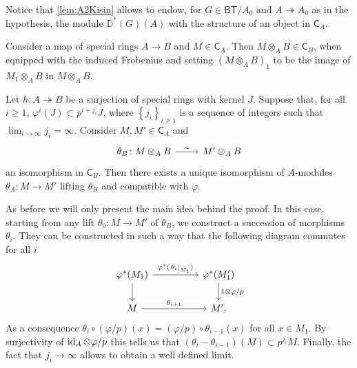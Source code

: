 \begin{rem}[]
	Notice that \cref{lem:A2Kisin} allows to endow,
	for $G \in \mathsf{BT}/A_0$ and $A \twoheadrightarrow A_0$ as in the hypothesis,
	the module $\mathbb{D}^*(G)(A)$ with the structure of an object in $\mathsf{C}_A$.
\end{rem}


\begin{defn}[]
	Consider a map of special rings $A \to B$ and $M \in \mathsf{C}_A$.
	Then $M \otimes_A B \in \mathsf{C}_B$, when equipped with
	the induced Frobenius %
	and setting
	$\left( M \otimes_A B \right)_1$ to be the image of
	$M_1 \otimes_A B$ in $M \otimes_A B$.
\end{defn}


\begin{lem}\label{lem:A4Kisin}
	Let $h\colon A \twoheadrightarrow B$ be a surjection of special rings with kernel $J$.
	Suppose that, for all $i \geq 1$, $\varphi^i(J) \subset p^{i + j_i} J$,
	where $\left\{ j_i \right\}_{i \geq 1}$ is a sequence of integers
	such that $\lim_{i \to \infty} j_i = \infty$.
	Consider $M, M' \in \mathsf{C}_A$ and
	\begin{equation*}
	\begin{tikzcd}[row sep = 0ex
		,/tikz/column 1/.append style={anchor=base east}
		,/tikz/column 2/.append style={anchor=base west}]
		\theta_B\colon M \otimes_A B 
		\arrow[r, "\sim", rightarrow] &
		M' \otimes_A B
	\end{tikzcd}
	\end{equation*} 
	an isomorphism in $\mathsf{C}_B$.
	Then there exists a unique isomorphism of $A$-modules
	$\theta_A\colon M \to M'$ lifting $\theta_B$ and compatible with $\varphi$.
\end{lem} 


\begin{rem}[]
	As before we will only present the main idea behind the proof.
	In this case, starting from any lift $\theta_0\colon M \to M'$
	of $\theta_B$, we construct a succession of morphisms \(\theta_i\).
	They can be constructed in such a way that the following diagram commutes for all \(i\)
	\begin{equation*}
	\begin{tikzcd}[column sep=4.8em]
		\varphi^*(M_1) \arrow[r, "\varphi^*(\left.\theta_i\right|_{ M_1 })", rightarrow] 
		\arrow[d, "", rightarrow] &
		\varphi^*(M_1') \arrow[d, "1 \otimes \varphi/p", rightarrow] \\
		M \arrow[r, "\theta_{ i+1 }", rightarrow] &
		M'.
	\end{tikzcd}
	\end{equation*}
	As a consequence \(\theta_i \circ (\varphi/p) (x) = (\varphi/p) \circ \theta_{ i-1 } (x)\)
	for all \(x \in M_1\).
	By surjectivity of \(\operatorname{id}_{ A } \otimes \varphi/p\) this
	tells us that \(\left( \theta_i - \theta_{ i-1 } \right)(M) \subset p^{ j_i }M\).
	Finally, the fact that $j_i \to \infty$ allows to obtain a well defined limit.
\end{rem}


